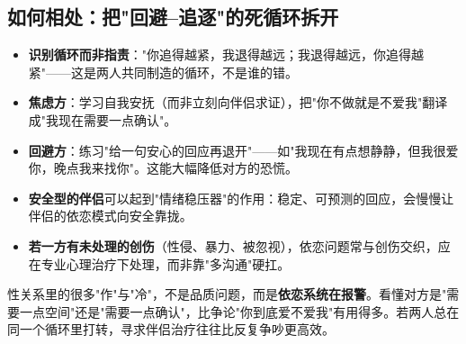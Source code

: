 \subsection{如何相处：把"回避--追逐"的死循环拆开}

\begin{itemize}
	\item \textbf{识别循环而非指责}："你追得越紧，我退得越远；我退得越远，你追得越紧"——这是两人共同制造的循环，不是谁的错。
	\item \textbf{焦虑方}：学习自我安抚（而非立刻向伴侣求证），把"你不做就是不爱我"翻译成"我现在需要一点确认"。
	\item \textbf{回避方}：练习"给一句安心的回应再退开"——如"我现在有点想静静，但我很爱你，晚点我来找你"。这能大幅降低对方的恐慌。
	\item \textbf{安全型的伴侣}可以起到"情绪稳压器"的作用：稳定、可预测的回应，会慢慢让伴侣的依恋模式向安全靠拢。
	\item \textbf{若一方有未处理的创伤}（性侵、暴力、被忽视），依恋问题常与创伤交织，应在专业心理治疗下处理，而非靠"多沟通"硬扛。
\end{itemize}

\begin{tcolorbox}[colback=pink!5!white,colframe=red!50!black,title=贴心小叮咛]
性关系里的很多"作"与"冷"，不是品质问题，而是\textbf{依恋系统在报警}。看懂对方是"需要一点空间"还是"需要一点确认"，比争论"你到底爱不爱我"有用得多。若两人总在同一个循环里打转，寻求伴侣治疗往往比反复争吵更高效。
\end{tcolorbox}

